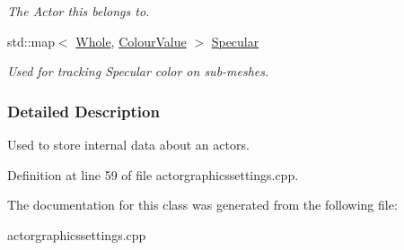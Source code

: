 \begin{DoxyCompactItemize}
\begin{DoxyCompactList}\small\item\em The Actor this belongs to. \item\end{DoxyCompactList}\item 
\hypertarget{classphys_1_1internal_1_1InternalActorGraphicsSettings_affba686bba9be08fee3af07ccee4711a}{
std::map$<$ \hyperlink{namespacephys_a460f6bc24c8dd347b05e0366ae34f34a}{Whole}, \hyperlink{classphys_1_1ColourValue}{ColourValue} $>$ \hyperlink{classphys_1_1internal_1_1InternalActorGraphicsSettings_affba686bba9be08fee3af07ccee4711a}{Specular}}
\label{classphys_1_1internal_1_1InternalActorGraphicsSettings_affba686bba9be08fee3af07ccee4711a}

\begin{DoxyCompactList}\small\item\em Used for tracking Specular color on sub-\/meshes. \item\end{DoxyCompactList}\end{DoxyCompactItemize}


\subsubsection{Detailed Description}
Used to store internal data about an actors. 

Definition at line 59 of file actorgraphicssettings.cpp.



The documentation for this class was generated from the following file:\begin{DoxyCompactItemize}
\item 
actorgraphicssettings.cpp\end{DoxyCompactItemize}
